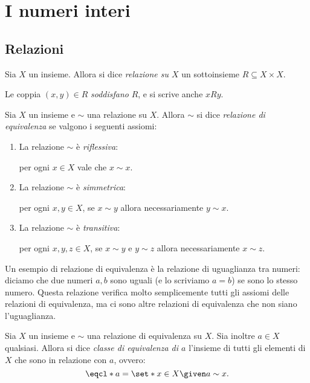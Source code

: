 \chapter{I numeri interi}

\section{Relazioni}

\begin{definition}
    Sia $X$ un insieme. Allora si dice \emph{relazione su $X$} un sottoinsieme $R \subseteq X \times X$. 
    
    Le coppia $(x, y) \in R$ \emph{soddisfano} $R$, e si scrive anche $xRy$. 
\end{definition}

\begin{definition}
    Sia $X$ un insieme e $\sim$ una relazione su $X$. Allora $\sim$ si dice \emph{relazione di equivalenza} se valgono i seguenti assiomi: \begin{enumerate}[label={(EQ\arabic*)}]
        \item La relazione $\sim$ è \emph{riflessiva}:
        
        per ogni $x \in X$ vale che $x \sim x$.
        \item La relazione $\sim$ è \emph{simmetrica}:
        
        per ogni $x, y \in X$, se $x \sim y$ allora necessariamente $y \sim x$.
        \item La relazione $\sim$ è \emph{transitiva}:
        
        per ogni $x, y, z \in X$, se $x \sim y$ e $y \sim z$ allora necessariamente $x \sim z$.
    \end{enumerate}
\end{definition}

Un esempio di relazione di equivalenza è la relazione di uguaglianza tra numeri: diciamo che due numeri $a, b$ sono uguali (e lo scriviamo $a = b$) se sono lo stesso numero. Questa relazione verifica molto semplicemente tutti gli assiomi delle relazioni di equivalenza, ma ci sono altre relazioni di equivalenza che non siano l'uguaglianza.

\begin{definition}
    Sia $X$ un insieme e $\sim$ una relazione di equivalenza su $X$. Sia inoltre $a \in X$ qualsiasi. Allora si dice \emph{classe di equivalenza di $a$} l'insieme di tutti gli elementi di $X$ che sono in relazione con $a$, ovvero: \begin{equation}
        \eqcl*{a} = \set*{x \in X \given a \sim x}.
    \end{equation}
\end{definition}

